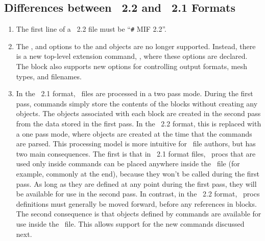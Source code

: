\subsection{Differences between \MIF~2.2 and \MIF~2.1 Formats}\label{sec:mif22diffs}
\begin{enumerate}
\item The first line of a \MIF~2.2 file must be ``\verb+#+ MIF 2.2''.
\item The ,  and
  options to the 
 and  objects are no longer supported.  Instead,
 there is a new top-level extension command, , where
 these options are declared.  The  block also
 supports new options for controlling output formats, mesh types, and
 filenames.
\item In the \MIF~2.1 format, \MIF\ files are
 processed in a two pass mode.  During the first pass, 
 commands simply store the contents of the  blocks without
 creating any  objects.  The  objects
 associated with each  block are created in the second pass
 from the data stored in the first pass.  In the \MIF~2.2 format, this is
 replaced with a one pass mode, where  objects are created
 at the time that the  commands are parsed.  This processing
 model is more intuitive for \MIF\ file authors, but has two main
 consequences.  The first is that in \MIF~2.1 format files, \Tcl\ procs that
 are used only inside  commands can be placed anywhere inside
 the \MIF\ file (for example, commonly at the end), because they won't be
 called during the first pass.  As long as they are defined at any point
 during the first pass, they will be available for use in the second
 pass.  In contrast, in the \MIF~2.2 format, \Tcl\ procs definitions must
 generally be moved forward, before any references in 
 blocks.  The second consequence is that  objects defined by
  commands are available for use inside the \MIF\ file.  This
 allows support for the new commands discussed next.
\end{enumerate}

